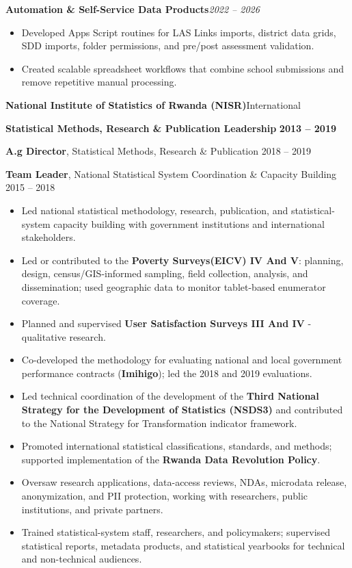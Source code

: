 \documentclass[10pt,letterpaper]{article}
\newcommand{\job}[4]{%
  \par\vspace{4pt}
  {\color{navy}\bfseries\large #1}\hfill{\color{muted}\small #2}\par\vspace{1pt}
  {\color{accent}\bfseries #3}\hfill{\small\bfseries\color{ink} #4}\par\vspace{1pt}}
\newcommand{\project}[2]{%
  \par\vspace{5pt}
  {\bfseries\color{navy} #1}\hfill{\small\color{muted}\itshape #2}\par}
\begin{document}
\project{Automation \& Self-Service Data Products}{2022 -- 2026}
\begin{itemize}
  \item Developed Apps Script routines for LAS Links imports, district data grids, SDD imports, folder permissions, and pre/post assessment validation.
  \item Created scalable spreadsheet workflows that combine school submissions and remove repetitive manual processing.
\end{itemize}

\job{National Institute of Statistics of Rwanda (NISR)}{International}
    {Statistical Methods, Research \& Publication Leadership}{2013 -- 2019}
{\small
  \textbf{A.g Director}, Statistical Methods, Research \& Publication \hfill 2018 -- 2019\par
  \textbf{Team Leader}, National Statistical System Coordination \& Capacity Building \hfill 2015 -- 2018\par}
\begin{itemize}
  \item Led national statistical methodology, research, publication, and statistical-system capacity building with government institutions and international stakeholders.
  \item Led or contributed to the \textbf{Poverty Surveys(EICV) IV And V}: planning, design, census/GIS-informed sampling, field collection, analysis, and dissemination; used geographic data to monitor tablet-based enumerator coverage.
  \item Planned and supervised \textbf{User Satisfaction Surveys III And IV} - qualitative research.
  \item Co-developed the methodology for evaluating national and local government performance contracts (\textbf{Imihigo}); led the 2018 and 2019 evaluations.
  \item Led technical coordination of the development of the \textbf{Third National Strategy for the Development of Statistics (NSDS3)} and contributed to the National Strategy for Transformation indicator framework.
  \item Promoted international statistical classifications, standards, and methods; supported implementation of the \textbf{Rwanda Data Revolution Policy}.
  \item Oversaw research applications, data-access reviews, NDAs, microdata release, anonymization, and PII protection, working with researchers, public institutions, and private partners.
  \item Trained statistical-system staff, researchers, and policymakers; supervised statistical reports, metadata products, and statistical yearbooks for technical and non-technical audiences.
\end{itemize}
\end{document}
